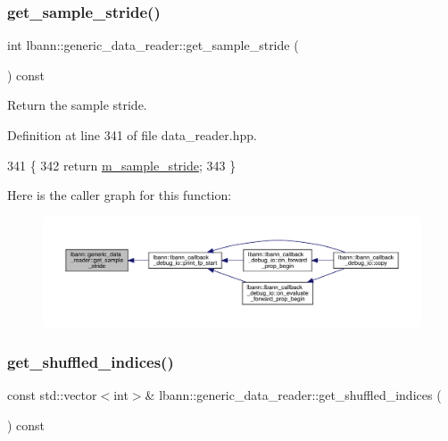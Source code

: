 \subsubsection{\texorpdfstring{get\+\_\+sample\+\_\+stride()}{get\_sample\_stride()}}
{\footnotesize\ttfamily int lbann\+::generic\+\_\+data\+\_\+reader\+::get\+\_\+sample\+\_\+stride (\begin{DoxyParamCaption}{ }\end{DoxyParamCaption}) const\hspace{0.3cm}{\ttfamily [inline]}}



Return the sample stride. 



Definition at line 341 of file data\+\_\+reader.\+hpp.


\begin{DoxyCode}
341                                 \{
342     \textcolor{keywordflow}{return} \hyperlink{classlbann_1_1generic__data__reader_a58461c39de7e17eafc5b98aec99cbb9b}{m\_sample\_stride};
343   \}
\end{DoxyCode}
Here is the caller graph for this function\+:\nopagebreak
\begin{figure}[H]
\begin{center}
\leavevmode
\includegraphics[width=350pt]{classlbann_1_1generic__data__reader_a48990d714a247463b135784f235f8a50_icgraph}
\end{center}
\end{figure}
\mbox{\label{classlbann_1_1generic__data__reader_a38eedaa9c8680e885a3ec05009f5f492}} 
\subsubsection{\texorpdfstring{get\+\_\+shuffled\+\_\+indices()}{get\_shuffled\_indices()}}
{\footnotesize\ttfamily const std\+::vector$<$int$>$\& lbann\+::generic\+\_\+data\+\_\+reader\+::get\+\_\+shuffled\+\_\+indices (\begin{DoxyParamCaption}{ }\end{DoxyParamCaption}) const\hspace{0.3cm}{\ttfamily [inline]}}

